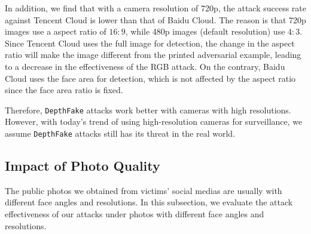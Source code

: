 In addition, we find that with a camera resolution of 720p, the attack success rate against Tencent Cloud is lower than that of Baidu Cloud. The reason is that 720p images use a aspect ratio of $16:9$, while 480p images (default resolution) use $4:3$. Since Tencent Cloud uses the full image  for detection, the change in the aspect ratio will make the image different from the printed adversarial example, leading to a decrease in the effectiveness of the RGB attack. On the contrary, Baidu Cloud uses the face area for detection, which is not affected by the aspect ratio since the face area ratio is fixed.

Therefore, \texttt{DepthFake} attacks work better with cameras with high resolutions. However, with today's trend of using high-resolution cameras for surveillance, we assume \texttt{DepthFake} attacks still has its threat in the real world.


\subsection{Impact of Photo Quality}
The public photos we obtained from victims' social medias are usually with different face angles and resolutions. In this subsection, we evaluate the attack effectiveness of our attacks under photos with different face angles and resolutions.


